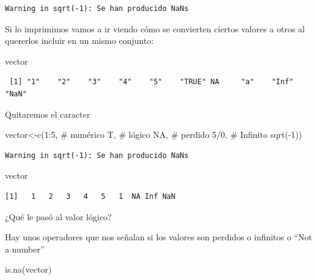 \documentclass[
  letterpaper,
  DIV=11,
  numbers=noendperiod]{scrreprt}
\newenvironment{Shaded}{\begin{snugshade}}{\end{snugshade}}
\newcommand{\CommentTok}[1]{\textcolor[rgb]{0.37,0.37,0.37}{#1}}
\newcommand{\ConstantTok}[1]{\textcolor[rgb]{0.56,0.35,0.01}{#1}}
\newcommand{\DecValTok}[1]{\textcolor[rgb]{0.68,0.00,0.00}{#1}}
\newcommand{\FunctionTok}[1]{\textcolor[rgb]{0.28,0.35,0.67}{#1}}
\newcommand{\NormalTok}[1]{\textcolor[rgb]{0.00,0.23,0.31}{#1}}
\newcommand{\OtherTok}[1]{\textcolor[rgb]{0.00,0.23,0.31}{#1}}
\newcommand{\SpecialCharTok}[1]{\textcolor[rgb]{0.37,0.37,0.37}{#1}}
\begin{document}
\begin{verbatim}
Warning in sqrt(-1): Se han producido NaNs
\end{verbatim}

Si lo imprimimos vamos a ir viendo cómo se convierten ciertos valores a
otros al quererlos incluir en un mismo conjunto:

\begin{Shaded}
\begin{Highlighting}[]
\NormalTok{vector}
\end{Highlighting}
\end{Shaded}

\begin{verbatim}
 [1] "1"    "2"    "3"    "4"    "5"    "TRUE" NA     "a"    "Inf"  "NaN" 
\end{verbatim}

Quitaremos el caracter

\begin{Shaded}
\begin{Highlighting}[]
\NormalTok{vector}\OtherTok{\textless{}{-}}\FunctionTok{c}\NormalTok{(}\DecValTok{1}\SpecialCharTok{:}\DecValTok{5}\NormalTok{, }\CommentTok{\# numérico}
\NormalTok{          T, }\CommentTok{\# lógico}
          \ConstantTok{NA}\NormalTok{, }\CommentTok{\# perdido}
          \DecValTok{5}\SpecialCharTok{/}\DecValTok{0}\NormalTok{, }\CommentTok{\# Infinito}
          \FunctionTok{sqrt}\NormalTok{(}\SpecialCharTok{{-}}\DecValTok{1}\NormalTok{))}
\end{Highlighting}
\end{Shaded}

\begin{verbatim}
Warning in sqrt(-1): Se han producido NaNs
\end{verbatim}

\begin{Shaded}
\begin{Highlighting}[]
\NormalTok{vector}
\end{Highlighting}
\end{Shaded}

\begin{verbatim}
[1]   1   2   3   4   5   1  NA Inf NaN
\end{verbatim}

¿Qué le pasó al valor lógico?

Hay unos operadores que nos señalan si los valores son perdidos o
infinitos o ``Not a number''

\begin{Shaded}
\begin{Highlighting}[]
\FunctionTok{is.na}\NormalTok{(vector)}
\end{Highlighting}
\end{Shaded}
\end{document}
